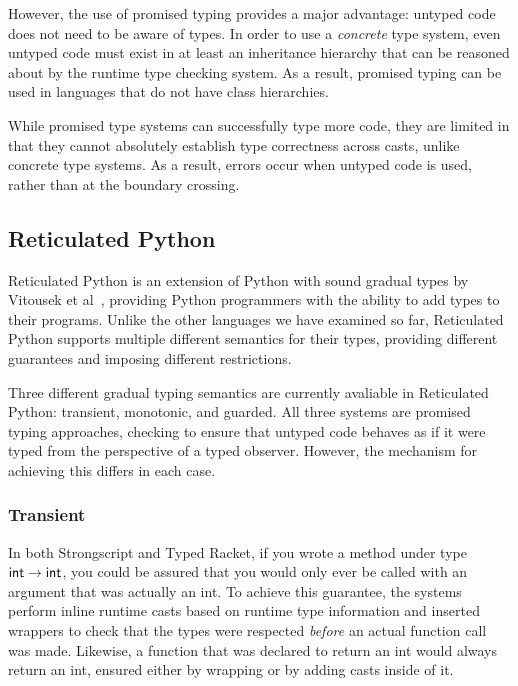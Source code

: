 \documentclass[a4paper,USenglish]{tex/lipics-v2016}
\begin{document}
However, the use of promised typing provides a major advantage: untyped code
does not need to be aware of types. In order to use a \emph{concrete} type
system, even untyped code must exist in at least an inheritance hierarchy
that can be reasoned about by the runtime type checking system. As a result,
promised typing can be used in languages that do not have class hierarchies.

While promised type systems can successfully type more code, they are
limited in that they cannot absolutely establish type correctness across
casts, unlike concrete type systems. As a result, errors occur when untyped
code is used, rather than at the boundary crossing.

\subsection{Reticulated Python}

Reticulated Python is an extension of Python with sound gradual types by
Vitousek et al~\cite{siek14}, providing Python programmers with
the ability to add types to their programs. Unlike the other languages we
have examined so far, Reticulated Python supports multiple different
semantics for their types, providing different guarantees and imposing
different restrictions.

Three different gradual typing semantics are currently avaliable in
Reticulated Python: transient, monotonic, and guarded. All three systems are
promised typing approaches, checking to ensure that untyped code behaves as
if it were typed from the perspective of a typed observer. However, the
mechanism for achieving this differs in each case.

\subsubsection{Transient}

In both Strongscript and Typed Racket, if you wrote a method 
under type ${\sf{int}} \rightarrow {\sf{int}}$, you could be
assured that you would only ever be called with an argument that was
actually an int. To achieve this guarantee, the systems perform 
inline runtime casts based on runtime type information and
inserted wrappers to check that the types were respected \emph{before} an
actual function call was made. Likewise, a function that was declared to
return an int would always return an int, ensured either by wrapping or by
adding casts inside of it.
\end{document}
